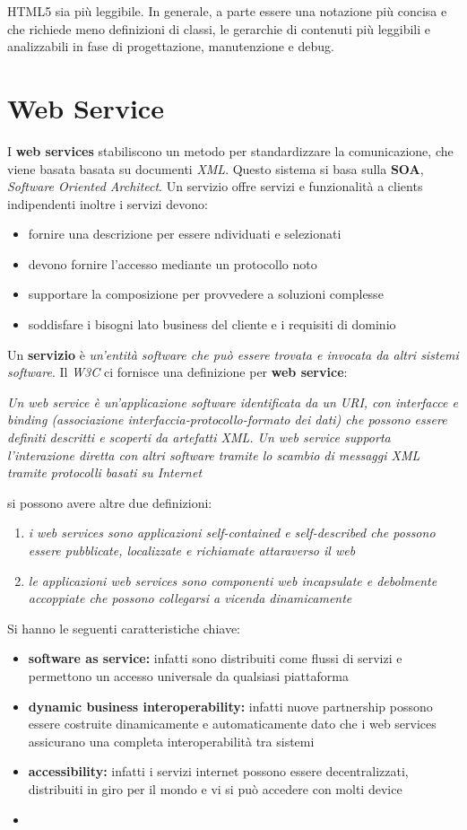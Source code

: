 \message{ !name(sd.tex)}\documentclass[a4paper,12pt, oneside]{book}
\begin{document}
HTML5 sia più leggibile. In generale, a parte essere una notazione più concisa e che richiede
meno definizioni di classi, le gerarchie di contenuti più leggibili e analizzabili 
in fase di progettazione, manutenzione e debug.
\chapter{Web Service}
I \textbf{web services} stabiliscono un metodo per standardizzare la comunicazione, che viene basata
basata su documenti \textit{XML}. Questo sistema si basa sulla \textbf{SOA}, \textit{Software Oriented Architect}.
Un servizio offre servizi e funzionalità a clients indipendenti inoltre i servizi devono:
\begin{itemize}
\item fornire una descrizione per essere ndividuati e selezionati
\item devono fornire l'accesso mediante un protocollo noto
\item supportare la composizione per provvedere a soluzioni complesse
\item soddisfare i bisogni lato business del cliente e i requisiti di dominio 
\end{itemize}
Un \textbf{servizio} è \textit{un'entità software che può essere trovata e invocata da altri sistemi software}.
Il \textit{W3C} ci fornisce una definizione per \textbf{web service}:
\begin{center}
  \textit{Un web service è un'applicazione software identificata da un URI, con interfacce e binding
    (associazione interfaccia-protocollo-formato dei dati) che possono essere definiti descritti e scoperti da artefatti XML.
    Un web service supporta l'interazione diretta con altri software tramite lo scambio di
    messaggi XML tramite protocolli basati su Internet}
\end{center}
si possono avere altre due definizioni:
\begin{enumerate}
\item \textit{i web services sono applicazioni self-contained e self-described che possono essere pubblicate, localizzate e richiamate attaraverso il web}
\item \textit{le applicazioni web services sono componenti web incapsulate e debolmente accoppiate che possono collegarsi a vicenda dinamicamente}
\end{enumerate}
Si hanno le seguenti caratteristiche chiave:
\begin{itemize}
\item \textbf{software as service:} infatti sono distribuiti come flussi di servizi e permettono un accesso universale da qualsiasi piattaforma
\item \textbf{dynamic business interoperability:} infatti nuove partnership possono essere costruite dinamicamente e automaticamente dato che
  i web services assicurano una completa interoperabilità tra sistemi
\item \textbf{accessibility:} infatti i servizi internet possono essere decentralizzati, distribuiti in giro per il mondo e vi si può accedere con molti device
\item 
  
\end{itemize}
\end{document}
